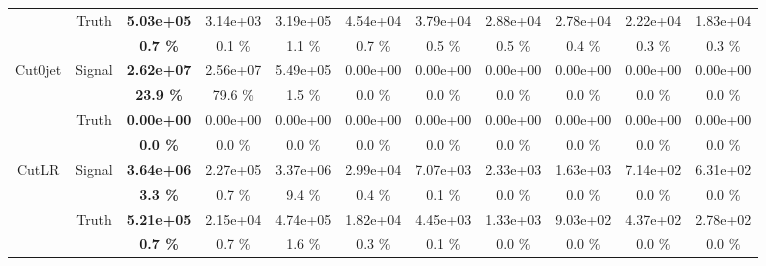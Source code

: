 \begin{landscape}
\begin{table}
\begin{tabular}{|c|c|>{\bfseries}c|c|c|c|c|c|c|c|c|}
                                    & \multirow{2}{*}{Truth}    & 5.03e+05 & 3.14e+03 & 3.19e+05 & 4.54e+04 & 3.79e+04 & 2.88e+04 & 2.78e+04 & 2.22e+04 & 1.83e+04 \\
                                    &                           & 0.7 \%   & 0.1 \%   & 1.1 \%   & 0.7 \%   & 0.5 \%   & 0.5 \%   & 0.4 \%   & 0.3 \%   & 0.3 \%   \\
    \hline                                                              
    \hline                                                              
    \multirow{4}{*}{Cut0jet}        & \multirow{2}{*}{Signal}   & 2.62e+07 & 2.56e+07 & 5.49e+05 & 0.00e+00 & 0.00e+00 & 0.00e+00 & 0.00e+00 & 0.00e+00 & 0.00e+00 \\
                                    &                           & 23.9 \%  & 79.6 \%  & 1.5 \%   & 0.0 \%   & 0.0 \%   & 0.0 \%   & 0.0 \%   & 0.0 \%   & 0.0 \%   \\
    \cline{2-11}                                                                                    
                                    & \multirow{2}{*}{Truth}    & 0.00e+00 & 0.00e+00 & 0.00e+00 & 0.00e+00 & 0.00e+00 & 0.00e+00 & 0.00e+00 & 0.00e+00 & 0.00e+00 \\
                                    &                           & 0.0 \%   & 0.0 \%   & 0.0 \%   & 0.0 \%   & 0.0 \%   & 0.0 \%   & 0.0 \%   & 0.0 \%   & 0.0 \%   \\
    \hline                                                              
    \hline                                                              
    \multirow{4}{*}{CutLR}          & \multirow{2}{*}{Signal}   & 3.64e+06 & 2.27e+05 & 3.37e+06 & 2.99e+04 & 7.07e+03 & 2.33e+03 & 1.63e+03 & 7.14e+02 & 6.31e+02 \\
                                    &                           & 3.3 \%   & 0.7 \%   & 9.4 \%   & 0.4 \%   & 0.1 \%   & 0.0 \%   & 0.0 \%   & 0.0 \%   & 0.0 \%   \\
    \cline{2-11}                                                                                    
                                    & \multirow{2}{*}{Truth}    & 5.21e+05 & 2.15e+04 & 4.74e+05 & 1.82e+04 & 4.45e+03 & 1.33e+03 & 9.03e+02 & 4.37e+02 & 2.78e+02 \\
                                    &                           & 0.7 \%   & 0.7 \%   & 1.6 \%   & 0.3 \%   & 0.1 \%   & 0.0 \%   & 0.0 \%   & 0.0 \%   & 0.0 \%   \\
    \hline                                                              

\end{tabular}
\end{table}
\end{landscape}
